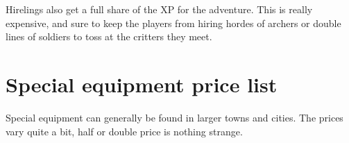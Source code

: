 Hirelings also get a full share of the XP for the adventure. This is really expensive, and sure to keep the players from hiring hordes of archers or double lines of soldiers to toss at the critters they meet.










\pagebreak[1]
\section*{Special equipment price list}

Special equipment can generally be found in larger towns and cities.
The prices vary quite a bit, half or double price is nothing strange.

